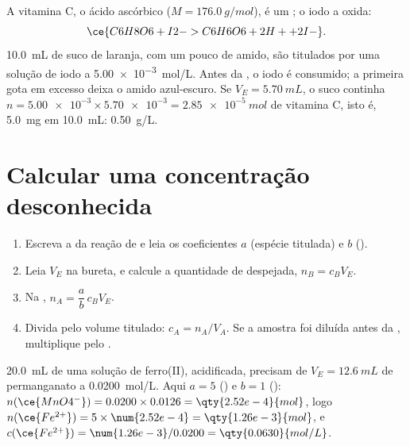 \begin{example}\label{ex:g11:titration:vitamin-c}
A vitamina C, o ácido ascórbico  ($M = \qty{176.0}{g/mol}$), é
um ; o iodo  a oxida:
\[
  \ce{C6H8O6 + I2 -> C6H6O6 + 2H+ + 2I-} .
\]
\qty{10.0}{mL} de suco de laranja, com um pouco de amido, são titulados
por uma solução de iodo a \qty{5.00e-3}{mol/L}. Antes da , o
iodo é consumido; a primeira gota em excesso deixa o amido azul-escuro.
Se $V_E = \qty{5.70}{mL}$, o suco continha
$n = \num{5.00e-3} \times \num{5.70e-3} = \qty{2.85e-5}{mol}$ de vitamina
C, isto é, \qty{5.0}{mg} em \qty{10.0}{mL}: \qty{0.50}{g/L}.
\end{example}

\section{Calcular uma concentração desconhecida}

\begin{method}\label{met:g11:titration:computing}
\begin{enumerate}
  \item Escreva a  da reação de  e leia os
        coeficientes $a$ (espécie titulada) e $b$ ().
  \item Leia $V_E$ na bureta, e calcule a quantidade de 
        despejada, $n_B = c_B V_E$.
  \item Na , $n_A = \dfrac{a}{b}\, c_B V_E$.
  \item Divida pelo volume titulado: $c_A = n_A / V_A$. Se a amostra foi
        diluída antes da , multiplique pelo .
\end{enumerate}
\end{method}

\begin{example}\label{ex:g11:titration:iron}
\qty{20.0}{mL} de uma solução de ferro(II), acidificada, precisam de
$V_E = \qty{12.6}{mL}$ de permanganato a \qty{0.0200}{mol/L}. Aqui
$a = 5$ () e $b = 1$ ():
$n(\ce{MnO4^-}) = 0.0200 \times 0.0126 = \qty{2.52e-4}{mol}$, logo
$n(\ce{Fe^{2+}}) = 5 \times \num{2.52e-4} = \qty{1.26e-3}{mol}$, e
$c(\ce{Fe^{2+}}) = \num{1.26e-3} / 0.0200 = \qty{0.0630}{mol/L}$.
\end{example}


